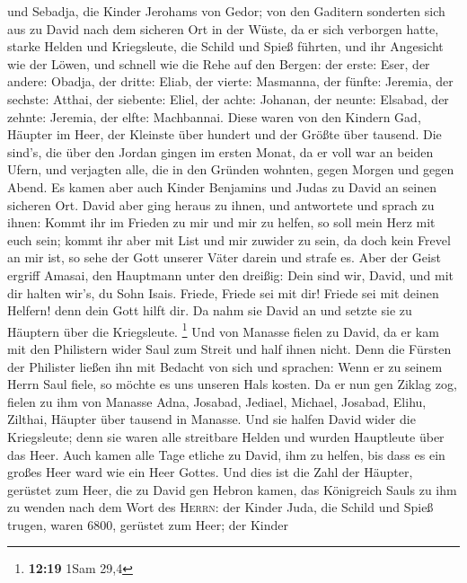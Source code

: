 und Sebadja, die Kinder Jerohams von Gedor;  von den
Gaditern sonderten sich aus zu David nach dem sicheren Ort in der Wüste,
da er sich verborgen hatte, starke Helden und Kriegsleute, die Schild
und Spieß führten, und ihr Angesicht wie der Löwen, und schnell wie die
Rehe auf den Bergen:  der erste: Eser, der andere:
Obadja, der dritte: Eliab,  der vierte: Masmanna, der
fünfte: Jeremia,  der sechste: Atthai, der siebente:
Eliel,  der achte: Johanan, der neunte: Elsabad,
 der zehnte: Jeremia, der elfte: Machbannai.
 Diese waren von den Kindern Gad, Häupter im Heer, der
Kleinste über hundert und der Größte über tausend.  Die
sind's, die über den Jordan gingen im ersten Monat, da er voll war an
beiden Ufern, und verjagten alle, die in den Gründen wohnten, gegen
Morgen und gegen Abend.  Es kamen aber auch Kinder
Benjamins und Judas zu David an seinen sicheren Ort. 
David aber ging heraus zu ihnen, und antwortete und sprach zu ihnen:
Kommt ihr im Frieden zu mir und mir zu helfen, so soll mein Herz mit
euch sein; kommt ihr aber mit List und mir zuwider zu sein, da doch kein
Frevel an mir ist, so sehe der Gott unserer Väter darein und strafe es.
 Aber der Geist ergriff Amasai, den Hauptmann unter den
dreißig: Dein sind wir, David, und mit dir halten wir's, du Sohn Isais.
Friede, Friede sei mit dir! Friede sei mit deinen Helfern! denn dein
Gott hilft dir. Da nahm sie David an und setzte sie zu Häuptern über die
Kriegsleute. \footnote{\textbf{12:19} 1Sam 29,4}  Und von
Manasse fielen zu David, da er kam mit den Philistern wider Saul zum
Streit und half ihnen nicht. Denn die Fürsten der Philister ließen ihn
mit Bedacht von sich und sprachen: Wenn er zu seinem Herrn Saul fiele,
so möchte es uns unseren Hals kosten.  Da er nun gen
Ziklag zog, fielen zu ihm von Manasse Adna, Josabad, Jediael, Michael,
Josabad, Elihu, Zilthai, Häupter über tausend in Manasse.
 Und sie halfen David wider die Kriegsleute; denn sie
waren alle streitbare Helden und wurden Hauptleute über das Heer.
 Auch kamen alle Tage etliche zu David, ihm zu helfen,
bis dass es ein großes Heer ward wie ein Heer Gottes. 
Und dies ist die Zahl der Häupter, gerüstet zum Heer, die zu David gen
Hebron kamen, das Königreich Sauls zu ihm zu wenden nach dem Wort des
\textsc{Herrn}:  der Kinder Juda, die Schild und Spieß
trugen, waren 6800, gerüstet zum Heer;  der Kinder
